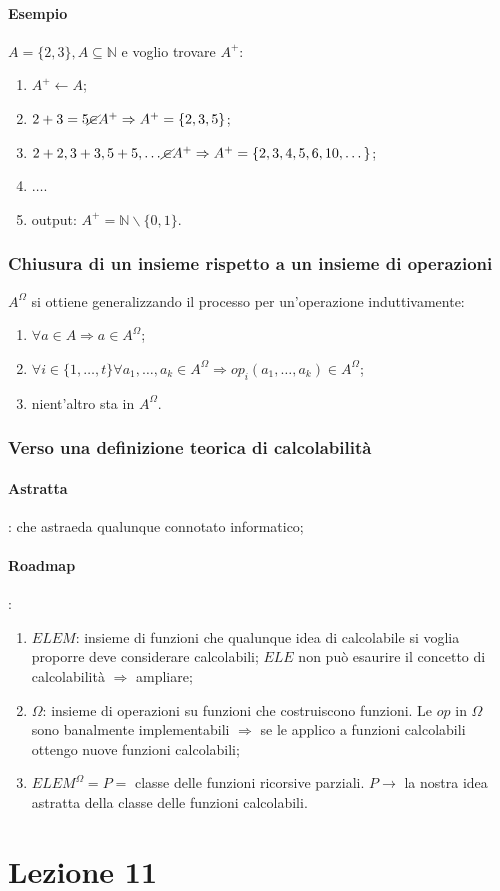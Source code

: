 \documentclass{article}
\begin{document}
\paragraph{Esempio}
$A=\{2,3\}, A \subseteq \mathbb{N}$ e voglio trovare $A^+$:
\begin{enumerate}
	\item $A^+ \leftarrow A$;
	\item $2+3=5 \cancel{\in} A^+ \Rightarrow A^+=\{2,3,5\}$;
	\item $2+2,3+3, 5+5, \dots \cancel{\in} A^+ \Rightarrow A^+=\{2,3,4,5,6,10, \dots \}$;
	\item $\dots$.
	\item output: $A^+ = \mathbb{N} \backslash \{0,1\}$.
\end{enumerate}

\subsubsection{Chiusura di un insieme rispetto a un insieme di operazioni}
$A^\Omega$ si ottiene generalizzando il processo per un'operazione induttivamente:
\begin{enumerate}
	\item $\forall a \in A \Rightarrow a \in A^{\Omega}$;
	\item $\forall i \in \{ 1,\dots,t \} \forall a_1, \dots, a_k \in A^{\Omega} \Rightarrow op_i(a_1, \dots, a_k) \in A^{\Omega}$;
	\item nient'altro sta in $A^{\Omega}$.
\end{enumerate}

\subsubsection{Verso una definizione teorica di calcolabilità}
\paragraph{Astratta}: che astraeda qualunque connotato informatico;




\paragraph{Roadmap}:
\begin{enumerate}

	\item $ELEM$: insieme di funzioni che qualunque idea di calcolabile si voglia proporre deve considerare calcolabili; $ELE$ non può esaurire il concetto di calcolabilità $\Rightarrow$ ampliare;
	\item $\Omega$: insieme di operazioni su funzioni che costruiscono funzioni. Le $op$ in $\Omega$ sono banalmente implementabili $\Rightarrow$ se le applico a funzioni calcolabili ottengo nuove funzioni calcolabili;
	\item $ELEM^\Omega = P =$ classe delle funzioni ricorsive parziali. $P \rightarrow$ la nostra idea astratta della classe delle funzioni calcolabili.


\end{enumerate}
	
\section{Lezione 11}
\end{document}
